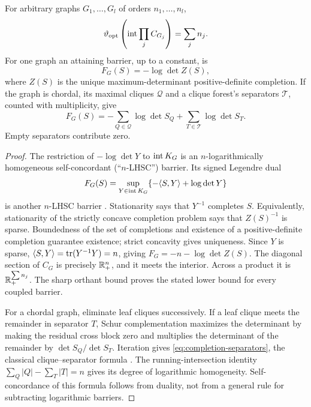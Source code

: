 \begin{proposition}
\label{prop:completion-parameter}
For arbitrary graphs $G_1,\ldots,G_l$ of orders $n_1,\ldots,n_l$,
\[
 \vartheta_{\rm opt}\left(\operatorname{int}\prod_j C_{G_j}\right)=\sum_j n_j.
\]
For one graph an attaining barrier, up to a constant, is
\begin{equation}\label{eq:maxdet-completion-barrier}
 F_G(S)=-\log\det Z(S),
\end{equation}
where $Z(S)$ is the unique maximum-determinant positive-definite completion.
If the graph is chordal, its maximal cliques $\mathcal Q$ and a clique
forest's separators $\mathcal T$, counted with multiplicity, give
\begin{equation}\label{eq:completion-separators}
 F_G(S)=-\sum_{Q\in\mathcal Q}\log\det S_Q
          +\sum_{T\in\mathcal T}\log\det S_T.
\end{equation}
Empty separators contribute zero.
\end{proposition}
\begin{proof}
The restriction of $-\log\det Y$ to $\operatorname{int} K_G$ is an $n$-logarithmically homogeneous
self-concordant (``$n$-LHSC'') barrier.  Its signed Legendre dual
\[
 F_G(S)=\sup_{Y\in\operatorname{int} K_G}\{-\langle S,Y\rangle+\log\det Y\}
\]
is another $n$-LHSC barrier \citep{ADV2013}.
Stationarity says that $Y^{-1}$ completes $S$.  Equivalently, stationarity
of the strictly concave completion problem says that $Z(S)^{-1}$ is
sparse.  Boundedness of the set of completions and existence of a
positive-definite completion guarantee existence; strict concavity gives
uniqueness.  Since $Y$ is sparse,
$\langle S,Y\rangle=\operatorname{tr}(Y^{-1}Y)=n$, giving
$F_G=-n-\log\det Z(S)$.
The diagonal section of $C_G$ is precisely $\mathbb R_+^n$, and it meets the
interior.  Across a product it is $\mathbb R_+^{\sum n_j}$.  The sharp orthant
bound proves the stated lower bound for every coupled barrier.

For a chordal graph, eliminate leaf cliques successively.  If a leaf
clique meets the remainder in separator $T$, Schur complementation
maximizes the determinant by making the residual cross block zero and
multiplies the determinant of the remainder by $\det S_Q/\det S_T$.
Iteration gives \eqref{eq:completion-separators}, the classical
clique--separator formula \citep{GJSW1984,BJL1989}.
The running-intersection identity
$\sum_Q|Q|-\sum_T|T|=n$ gives its degree of logarithmic homogeneity.
Self-concordance of this formula follows from duality, not from a
general rule for subtracting logarithmic barriers.
\end{proof}

